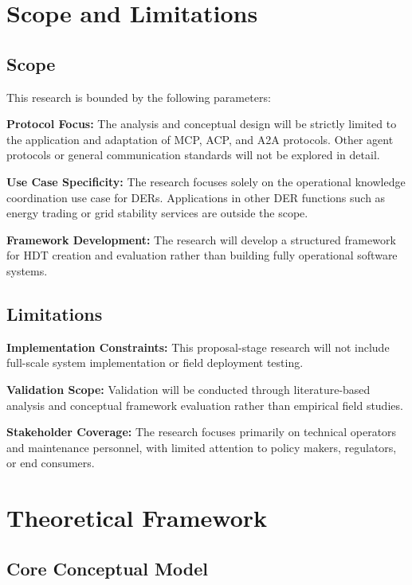 \documentclass[12pt,a4paper]{article}
\begin{document}
\section{Scope and Limitations}
\label{sec:scope}

\subsection{Scope}

This research is bounded by the following parameters:

\textbf{Protocol Focus:} The analysis and conceptual design will be strictly limited to the application and adaptation of MCP, ACP, and A2A protocols. Other agent protocols or general communication standards will not be explored in detail.

\textbf{Use Case Specificity:} The research focuses solely on the operational knowledge coordination use case for DERs. Applications in other DER functions such as energy trading or grid stability services are outside the scope.

\textbf{Framework Development:} The research will develop a structured framework for HDT creation and evaluation rather than building fully operational software systems.

\subsection{Limitations}

\textbf{Implementation Constraints:} This proposal-stage research will not include full-scale system implementation or field deployment testing.

\textbf{Validation Scope:} Validation will be conducted through literature-based analysis and conceptual framework evaluation rather than empirical field studies.

\textbf{Stakeholder Coverage:} The research focuses primarily on technical operators and maintenance personnel, with limited attention to policy makers, regulators, or end consumers.

\section{Theoretical Framework}
\label{sec:framework}

\subsection{Core Conceptual Model}
\end{document}
